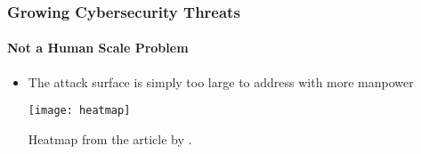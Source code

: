 \begin{frame}
  \frametitle{Growing Cybersecurity Threats}
  \framesubtitle{Not a Human Scale Problem}
  \begin{itemize}
    \item<1-> The attack surface is simply too large to address with more manpower

          \texttt{[image: heatmap]}

           {\scriptsize{Heatmap from the article by \textcite{bangaWhyCybersecurityNot2020}.}}

  \end{itemize}
\end{frame}
